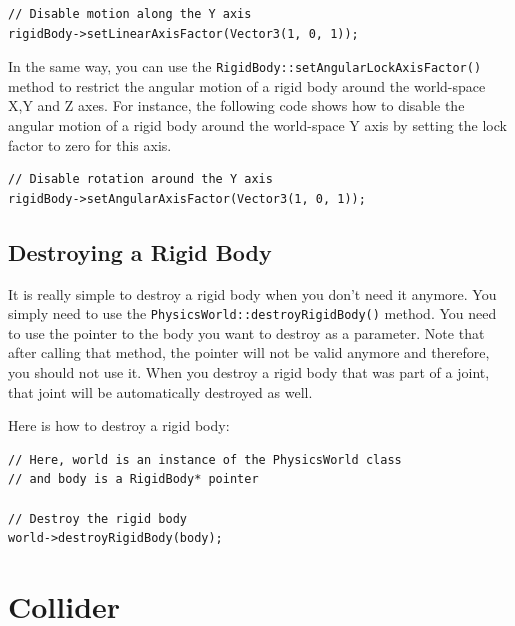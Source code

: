 \documentclass[a4paper,12pt]{article}
\begin{document}
    \begin{lstlisting}
// Disable motion along the Y axis
rigidBody->setLinearAxisFactor(Vector3(1, 0, 1));
  \end{lstlisting}

    \vspace{0.6cm}

    In the same way, you can use the \texttt{RigidBody::setAngularLockAxisFactor()} method to restrict the angular motion of a rigid body around the
    world-space X,Y and Z axes. For instance, the following code shows how to disable the angular motion of a rigid body around the world-space Y axis
    by setting the lock factor to zero for this axis. \\

    \begin{lstlisting}
// Disable rotation around the Y axis
rigidBody->setAngularAxisFactor(Vector3(1, 0, 1));
  \end{lstlisting}

    \subsection{Destroying a Rigid Body}

    \begin{sloppypar}
    It is really simple to destroy a rigid body when you don't need it anymore. You simply need to use the \texttt{PhysicsWorld::destroyRigidBody()}
    method. You need to use the pointer to the body you want to destroy as a parameter. Note that after calling that method, the pointer will not be valid
    anymore and therefore, you should not use it. When you destroy a rigid body that was part of a joint, that joint will be automatically destroyed as
    well. \\
    \end{sloppypar}

    Here is how to destroy a rigid body: \\

    \begin{lstlisting}
// Here, world is an instance of the PhysicsWorld class
// and body is a RigidBody* pointer

// Destroy the rigid body
world->destroyRigidBody(body);
  \end{lstlisting}

    \section{Collider}
    \label{sec:collider}
\end{document}

